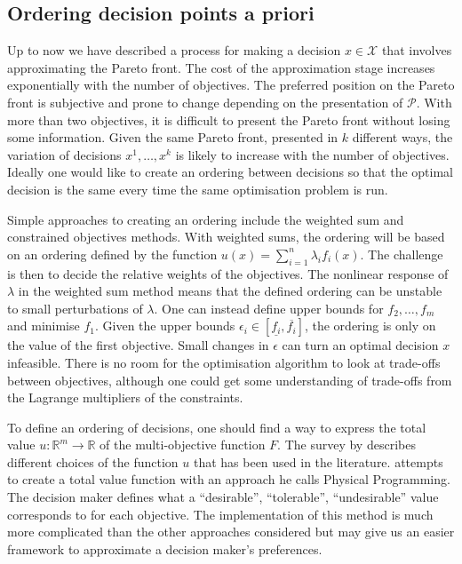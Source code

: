 \documentclass[main.tex]{subfiles}
\begin{document}
\subsection{Ordering decision points a priori}\label{sec:multi_apriori}
Up to now we have described a process for making a decision
$x\in\mathcal{X}$ that involves approximating the Pareto
front.
The cost of the approximation stage increases exponentially with the
number of objectives. The preferred position on the Pareto front is
subjective and prone to change depending on the presentation of
$\mathcal{P}$. With more than two objectives, it is difficult to
present the Pareto front without losing some information.
Given the same Pareto front, presented in
$k$ different ways, the variation of decisions $x^1,\dots,x^k$ is likely to
increase with the number of objectives.
Ideally one would like to create an ordering between decisions so
that the optimal decision is the same every time the same optimisation
problem is run.

Simple approaches to creating an ordering include the weighted sum
and constrained objectives methods.
With weighted sums, the ordering will be based on
an ordering defined by the function $u(x)=\sum_{i=1}^n\lambda_if_i(x)$.
The challenge is then to decide the relative weights of the objectives. The
nonlinear response of $\lambda$ in the weighted sum method means that
the defined ordering can be unstable to small perturbations of $\lambda$.
One can instead define upper bounds for $f_2,\dots,f_m$ and minimise
$f_1$.
Given the upper bounds
$\epsilon_i\in[\underline{f_i},\overline{f_i}]$,
the ordering is only on the value of the first objective.
Small changes in $\epsilon$ can turn an optimal decision $x$
infeasible. There is no room for the optimisation algorithm to
look at trade-offs between objectives, although one could get some
understanding of trade-offs from the
Lagrange multipliers of the constraints.

To define an ordering of decisions, one should find a way to express
the total value $u:\mathbb{R}^m\to\mathbb{R}$ of the multi-objective
function $F$. The survey by \citet{marler2004survey} describes
different choices of the function $u$ that has been used in the literature.
\citet{messac1996physical} attempts to create a total value function
with an approach he calls Physical Programming. The decision
maker defines what a ``desirable'', ``tolerable'',
``undesirable'' value corresponds to for each objective. The implementation of this method
is much more complicated than the other approaches considered but
may give us an easier framework to approximate a decision maker's preferences.
\end{document}
